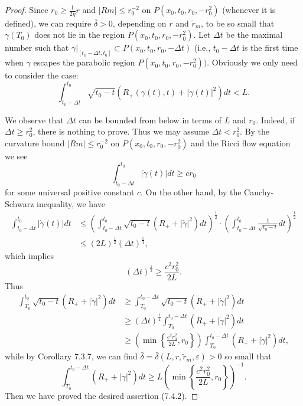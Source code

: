 \begin{proof}
\medskip
Since $r_0\geq \frac{1}{2\eta}r$ and $|Rm|\leq r^{-2}_0$ on
$P(x_0,t_0,r_0,-r^2_0)$ (whenever it is defined), we can require
$\bar{\delta}>0$, depending on $r$ and $\widetilde{r}_m$, to be so
small that $\gamma(T_0)$ does not lie in the region
$P(x_0,t_0,r_0,-r^2_0)$. Let $\Delta t$ be the maximal number such
that $\gamma|_{[t_0-\Delta t,t_0]}\subset P(x_0,t_0,r_0,-\Delta
t)$ (i.e., $t_0-\Delta t$ is the first time when $\gamma$ escapes
the parabolic region $P(x_0,t_0,r_0,-r^2_0)).$ Obviously we only
need to consider the case:
$$
\int^{t_0}_{t_0 -\Delta t}\sqrt{t_0 -
t}(R_+(\gamma(t),t)+|\dot{\gamma}(t)|^2)dt<L.
$$

We observe that $\Delta t$ can be bounded from below in terms of
$L$ and $r_0$. Indeed, if $\Delta t \geq r_0^2$, there is nothing
to prove. Thus we may assume $\Delta t<r_0^2$. By the curvature
bound $|Rm|\leq r^{-2}_0$ on $P(x_0,t_0,r_0,-r^2_0)$ and the Ricci
flow equation we see
$$
\int^{t_0}_{t_0-\Delta t}|\dot{\gamma}(t)|dt\geq cr_0
$$
for some universal positive constant $c$. On the other hand, by
the Cauchy-Schwarz inequality, we have
\begin{align*}
\int^{t_0}_{t_0-\Delta t}|\dot{\gamma}(t)|dt & \leq
\left(\int^{t_0}_{t_0-\Delta t}\sqrt{t_0-t}(R_++|
\dot{\gamma}|^2)dt\right)^{\frac{1}{2}} \cdot\left(\int^{t_0}_{t_0-\Delta
t}\frac{1}{\sqrt{t_0-t}}dt\right)^{\frac{1}{2}}\\
&  \leq (2L)^{\frac{1}{2}}(\Delta t)^{\frac{1}{4}},
\end{align*}
which implies \begin{equation}
(\Delta t)^{\frac{1}{2}}\geq\frac{c^2r^2_0}{2L}. %
\end{equation} Thus
\begin{align*}
\int^{t_0}_{T_0}\sqrt{t_0-t}(R_++|\dot{\gamma}|^2)dt& \geq
\int^{t_0-\Delta
t}_{T_0}\sqrt{t_0-t}(R_++|\dot{\gamma}|^2)dt\\
&  \geq (\Delta t)^{\frac{1}{2}}\int^{t_0-\Delta
t}_{T_0}(R_++|\dot{\gamma}|^2)dt\\
&  \geq \left(\min \left\{\frac{c^2r^2_0}{2L},r_0 \right\}\right)
\int^{t_0-\Delta t}_{T_0}(R_++|\dot{\gamma}|^2)dt,
\end{align*}
while by Corollary 7.3.7, we can find
$\bar{\delta}=\bar{\delta}(L,r,\widetilde{r}_m,\varepsilon)>0$ so
small that
$$
\int^{t_0-\Delta t}_{T_0}(R_++|\dot{\gamma}|^2)dt \geq
L\left(\min\left\{\frac{c^2r^2_0}{2L},r_0 \right\}\right)^{-1}.
$$
Then we have proved the desired assertion (7.4.2).


\end{proof}
